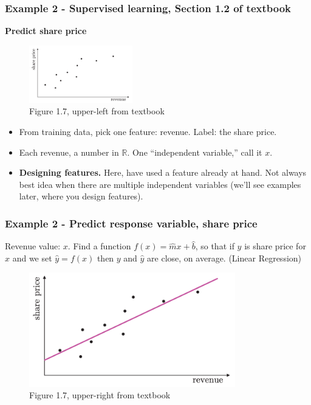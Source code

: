\documentclass{beamer}
\theoremstyle{example}
\newcommand{\bb}[1]{\mathbb{#1}}
\begin{document}
\begin{frame}
\frametitle{Example 2 - Supervised learning, Section 1.2 of textbook}
\textbf{Predict share price}

\begin{figure}
\includegraphics[width=0.4\textwidth]{../../Images/Fig1-7a.png}
\caption*{Figure 1.7, upper-left from textbook}
\end{figure}

\begin{itemize}
    \item From training data, pick one feature: revenue. Label: the share price.
    \pause
    \item Each revenue, a number in $\bb R$. One ``independent variable,'' call it $x$.
    \pause
    \item \textbf{Designing features.} Here, have used a feature already at hand. Not always best idea when there are multiple independent variables (we'll see examples later, where you design features).
\end{itemize}
\end{frame}

\begin{frame}
    \frametitle{Example 2 - Predict response variable, share price}
    Revenue value: $x$.  Find a function $f(x) = \hat{m}x + \hat{b}$, so that if $y$ is share price for $x$ and we set $\hat{y} = f(x)$ then $y$ and $\hat{y}$ are close, on average. (Linear Regression)

    \begin{figure}
        \includegraphics[width=0.8\textwidth]{../../Images/Fig1-7b.png}
    \caption*{Figure 1.7, upper-right from textbook}
    \end{figure}
\end{frame}
\end{document}
